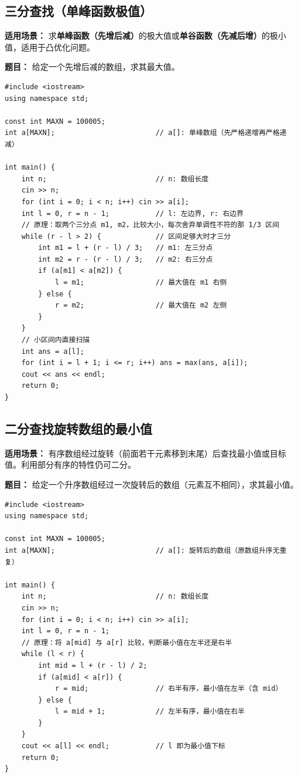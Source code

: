 \documentclass[12pt,a4paper]{ctexart}
\begin{document}
\subsection{三分查找（单峰函数极值）}
\textbf{适用场景：} 求\textbf{单峰函数（先增后减）}的极大值或\textbf{单谷函数（先减后增）}的极小值，适用于凸优化问题。

\textbf{题目：} 给定一个先增后减的数组，求其最大值。

\begin{lstlisting}[caption={三分查找——求单峰数组最大值}]
#include <iostream>
using namespace std;

const int MAXN = 100005;
int a[MAXN];                        // a[]: 单峰数组（先严格递增再严格递减）

int main() {
    int n;                          // n: 数组长度
    cin >> n;
    for (int i = 0; i < n; i++) cin >> a[i];
    int l = 0, r = n - 1;           // l: 左边界, r: 右边界
    // 原理：取两个三分点 m1, m2，比较大小，每次舍弃单调性不符的那 1/3 区间
    while (r - l > 2) {             // 区间足够大时才三分
        int m1 = l + (r - l) / 3;   // m1: 左三分点
        int m2 = r - (r - l) / 3;   // m2: 右三分点
        if (a[m1] < a[m2]) {
            l = m1;                 // 最大值在 m1 右侧
        } else {
            r = m2;                 // 最大值在 m2 左侧
        }
    }
    // 小区间内直接扫描
    int ans = a[l];
    for (int i = l + 1; i <= r; i++) ans = max(ans, a[i]);
    cout << ans << endl;
    return 0;
}
\end{lstlisting}

\subsection{二分查找旋转数组的最小值}
\textbf{适用场景：} 有序数组经过旋转（前面若干元素移到末尾）后查找最小值或目标值。利用部分有序的特性仍可二分。

\textbf{题目：} 给定一个升序数组经过一次旋转后的数组（元素互不相同），求其最小值。

\begin{lstlisting}[caption={二分查找——旋转有序数组中的最小值}]
#include <iostream>
using namespace std;

const int MAXN = 100005;
int a[MAXN];                        // a[]: 旋转后的数组（原数组升序无重复）

int main() {
    int n;                          // n: 数组长度
    cin >> n;
    for (int i = 0; i < n; i++) cin >> a[i];
    int l = 0, r = n - 1;
    // 原理：将 a[mid] 与 a[r] 比较，判断最小值在左半还是右半
    while (l < r) {
        int mid = l + (r - l) / 2;
        if (a[mid] < a[r]) {
            r = mid;                // 右半有序，最小值在左半（含 mid）
        } else {
            l = mid + 1;            // 左半有序，最小值在右半
        }
    }
    cout << a[l] << endl;           // l 即为最小值下标
    return 0;
}
\end{lstlisting}
\end{document}

